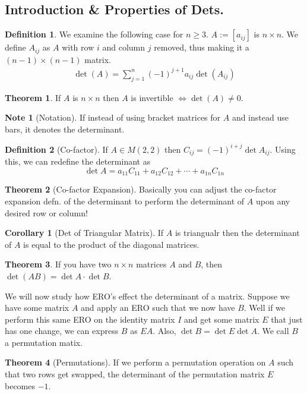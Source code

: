 \documentclass{article}
\numberwithin{equation}{section}
\theoremstyle{definition}
\newtheorem{thm}{Theorem}[subsection]
\newtheorem{defn}{Definition}[subsection]
\newtheorem{cor}{Corollary}[thm]
\newtheorem{note}{Note}[subsection]
\newcommand{\x}{\times}
\theoremstyle{adefn}
\begin{document}
	\subsection{Introduction \& Properties of Dets. }
	\begin{defn}
		We examine the following case for $n \geq 3$. $A := [a_{ij}]$ is $n \x n$. We define $A_{ij}$ as $A$ with row $i$ and column $j$ removed, thus making it a $(n-1) \x (n-1)$ matrix. 
		\begin{align*}
			\det(A) = \sum_{j=1}^n (-1)^{j + 1} a_{ij} \det(A_{ij}) \tag{7.1}
		\end{align*}
	\end{defn}
	\begin{thm}
		If $A$  is $n \x n$ then $A$ is invertible $\iff \det(A) \neq 0$. 
	\end{thm}
	\begin{note}[Notation]
		If instead of using bracket matrices for $A$ and instead use bars, it denotes the determinant.
	\end{note}
	\begin{defn}[Co-factor]
		If $A \in M(2, 2)$ then $C_{ij} = (-1)^{i+j}\det A_{ij}$. Using this, we can redefine the determinant as
		$$\det A = a_{11}C_{11} + a_{12}C_{12} + \cdots + a_{1n}C_{1n}$$
	\end{defn}
	\begin{thm}[Co-factor Expansion]
		Basically you can adjust the co-factor expansion defn. of the determinant to perform the determinant of $A$ upon any desired row or column!
	\end{thm}
	\begin{cor}[Det of Triangular Matrix]
		If $A$ is triangualr then the determinant of $A$ is equal to the product of the diagonal matrices. 
	\end{cor}
	\begin{thm}
		If you have two $n \x n$ matrices $A$ and $B$, then $\det(AB) = \det A \cdot \det B$.
	\end{thm}
	We will now study how ERO's effect the determinant of a matrix. Suppose we have some matrix $A$ and apply an ERO such that we now have $B$. Well if we perform this same ERO on the identity matrix $I$ and get some matrix $E$ that just has one change, we can express $B$ as $EA$. Also, $\det B = \det E \det A$.
	We call $B$ a permutation matix.
	\begin{thm}[Permutations]
		If we perform a permutation operation on $A$ such that two rows get swapped, the determinant of the permutation matrix $E$ becomes $-1$. 
	\end{thm}
\end{document}

